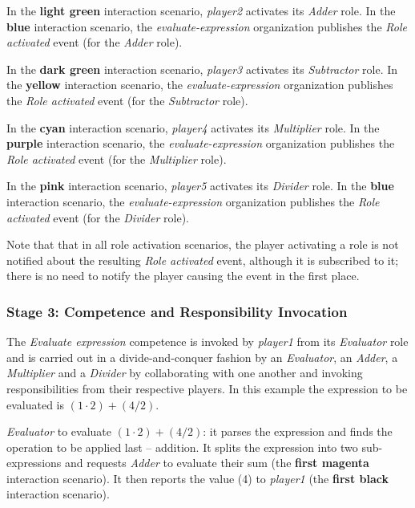In the \textbf{light green} interaction scenario, \textit{player2} activates its \textit{Adder} role.
In the \textbf{blue} interaction scenario, the \textit{evaluate-expression} organization publishes the \textit{Role activated} event (for the \textit{Adder} role).

In the \textbf{dark green} interaction scenario, \textit{player3} activates its \textit{Subtractor} role.
In the \textbf{yellow} interaction scenario, the \textit{evaluate-expression} organization publishes the \textit{Role activated} event (for the \textit{Subtractor} role).

In the \textbf{cyan} interaction scenario, \textit{player4} activates its \textit{Multiplier} role.
In the \textbf{purple} interaction scenario, the \textit{evaluate-expression} organization publishes the \textit{Role activated} event (for the \textit{Multiplier} role).

In the \textbf{pink} interaction scenario, \textit{player5} activates its \textit{Divider} role.
In the \textbf{blue} interaction scenario, the \textit{evaluate-expression} organization publishes the \textit{Role activated} event (for the \textit{Divider} role).

Note that that in all role activation scenarios, the player activating a role is not notified about the resulting \textit{Role activated} event, although it is subscribed to it; there is no need to notify the player causing the event in the first place.

\subsubsection*{Stage 3: Competence and Responsibility Invocation}

The \textit{Evaluate expression} competence is invoked by \textit{player1} from its \textit{Evaluator} role and is carried out in a divide-and-conquer fashion by an \textit{Evaluator}, an \textit{Adder}, a \textit{Multiplier} and a \textit{Divider} by collaborating with one another and invoking responsibilities from their respective players.
In this example the expression to be evaluated is $(1\cdot2)+(4/2)$.

\textit{Evaluator} to evaluate $(1\cdot2)+(4/2)$: it parses the expression and finds the operation to be applied last -- addition.
It splits the expression into two sub-expressions and requests \textit{Adder} to evaluate their sum (the \textbf{first magenta} interaction scenario).
It then reports the value (4) to \textit{player1} (the \textbf{first black} interaction scenario).

